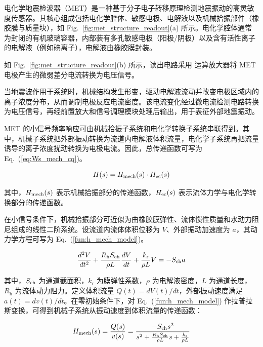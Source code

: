 \documentclass[sn-nature]{sn-jnl}
\newcommand{\kr}{k_{\text{r}}} %
\begin{document}
电化学地震检波器（MET）是一种基于分子电子转移原理检测地震振动的高灵敏度传感器。其核心组成包括电化学腔体、敏感电极、电解液以及机械拾振部件（橡胶膜与质量块），如 Fig.~\ref{fig:met_structure_readout}(a) 所示。电化学腔体通常为封闭的有机玻璃容器，内部装有多孔敏感电极（阳极/阴极）以及含有活性离子的电解液（例如碘离子），电解液由橡胶膜封装。

如 Fig.~\ref{fig:met_structure_readout}(b) 所示，读出电路采用 \valReadoutAmplifier{} 运算放大器将 MET 电极产生的微弱差分电流转换为电压信号。

当地震波作用于系统时，机械结构发生形变，驱动电解液流动并改变电极区域内的离子浓度分布，从而调制电极反应电流密度。该电流变化经过微电流检测电路转换为电压信号，再经前置放大和信号调理模块处理后输出，用于表征外部地震振动。

MET 的小信号频率响应可由机械拾振子系统和电化学转换子系统串联得到\cite{WOS:000318036400036}。其中，机械子系统把外部振动转换为流道内电解液体积流量，电化学子系统再把流量诱导的离子浓度扰动转换为电极电流。因此，总传递函数可写为 Eq.~(\ref{eq:Ws_mech_cq})。

\begin{equation}\label{eq:Ws_mech_cq}
    H(s)  = H_{\rm mech}(s) \cdot H_{\rm ec}(s)
\end{equation}

其中，$H_{\rm mech}(s)$ 表示机械拾振部分的传递函数，$H_{\rm ec}(s)$ 表示流体力学与电化学转换部分的传递函数。

在小信号条件下，机械拾振部分可近似为由橡胶膜弹性、流体惯性质量和水动力阻尼组成的线性二阶系统。设流道内流体体积位移为 $V$、外部振动加速度为 $a$，其动力学方程可写为 Eq.~(\ref{fun:h_mech_model})。

\begin{equation}
    \frac{d^2 V}{dt^2} + \frac{R_{\text{h}} S_{\rm ch}}{\rho L} \frac{dV}{dt} + \frac{\kr}{\rho L} V = -S_{\rm ch} a
    \label{fun:h_mech_model}
\end{equation}

其中，$S_{\rm ch}$ 为通道截面积，$\kr$ 为膜弹性系数，$\rho$ 为电解液密度，$L$ 为通道长度，$R_{\text{h}}$ 为流体动力阻力\cite{agafonov2015}。定义体积流量 $Q(t)=dV(t)/dt$，外部振动速度满足 $a(t)=dv(t)/dt$。在零初始条件下，对 Eq.~(\ref{fun:h_mech_model}) 作拉普拉斯变换，可得到机械子系统从振动速度到体积流量的传递函数：

\begin{equation}
    H_{\rm mech}(s)  = \frac{Q(s)}{v(s)} = \frac{- S_{\rm ch} s^2}{s^2 + \frac{R_{\text{h}} S_{\rm ch}}{\rho L}s + \frac{\kr}{\rho L }}
    \label{fun:h_mech_transfer}
\end{equation}
\end{document}
